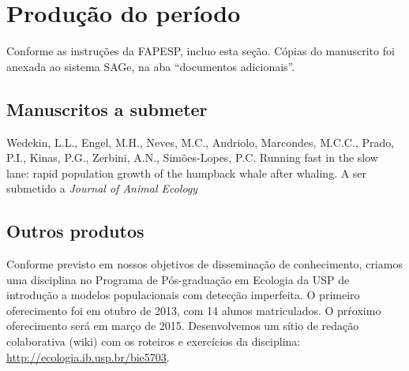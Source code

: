 \section{Produção do período} %
Conforme as instruções da FAPESP, incluo esta seção. 
Cópias do manuscrito foi anexada ao sistema SAGe, na aba ``documentos adicionais''.

\subsection{Manuscritos a submeter}
\label{sec:manuscritos-submeter}
\begin{thebibliography}{99}
 Wedekin, L.L., Engel, M.H., Neves, M.C., Andriolo, Marcondes, M.C.C., Prado, P.I., Kinas, P.G., Zerbini, A.N., 
Simões-Lopes, P.C. Running fast in the slow lane: rapid population growth of the humpback whale after whaling. A ser submetido a \emph{Journal of Animal Ecology}
\end{thebibliography}

\subsection{Outros produtos}
\label{sec:outros-produtos}

Conforme previsto em nossos objetivos de disseminação de conhecimento, 
criamos uma disciplina no Programa de Pós-graduação em Ecologia da USP de introdução
a modelos populacionais com detecção imperfeita. O primeiro oferecimento foi em otubro de 2013,
com 14 alunos matriculados. O prŕoximo oferecimento será em março de 2015. Desenvolvemos um sítio
de redação colaborativa (wiki) com os roteiros e exercícios da disciplina: \url{http://ecologia.ib.usp.br/bie5703}.

